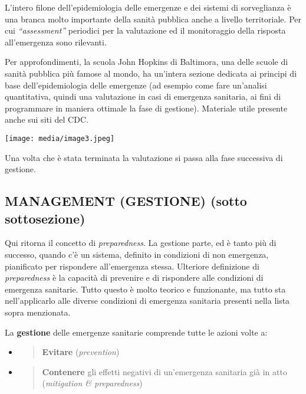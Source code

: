 \documentclass[]{article}
\begin{document}
L'intero filone dell'epidemiologia delle emergenze e dei sistemi di
sorveglianza è una branca molto importante della sanità pubblica anche a
livello territoriale. Per cui \emph{``assessment''} periodici per la
valutazione ed il monitoraggio della risposta all'emergenza sono
rilevanti.

Per approfondimenti, la scuola John Hopkins di Baltimora, una delle
scuole di sanità pubblica più famose al mondo, ha un'intera sezione
dedicata ai principi di base dell'epidemiologia delle emergenze (ad
esempio come fare un'analisi quantitativa, quindi una valutazione in
casi di emergenza sanitaria, ai fini di programmare in maniera ottimale
la fase di gestione). Materiale utile presente anche sui siti del CDC.

\texttt{[image: media/image3.jpeg]}

Una volta che è stata terminata la valutazione si passa alla fase
successiva di gestione.

\subsection{MANAGEMENT (GESTIONE) (sotto
sottosezione)}\label{management-gestione-sotto-sottosezione}

Qui ritorna il concetto di \emph{preparedness}. La gestione parte, ed è
tanto più di successo, quando c'è un sistema, definito in condizioni di
non emergenza, pianificato per rispondere all'emergenza stessa.
Ulteriore definizione di \emph{preparedness} è la capacità di prevenire
e di rispondere alle condizioni di emergenza sanitarie. Tutto questo è
molto teorico e funzionante, ma tutto sta nell'applicarlo alle diverse
condizioni di emergenza sanitaria presenti nella lista sopra menzionata.

La \textbf{gestione} delle emergenze sanitarie comprende tutte le azioni
volte a:

\begin{itemize}
\item
  \begin{quote}
  \textbf{Evitare} (\emph{prevention})
  \end{quote}
\item
  \begin{quote}
  \textbf{Contenere} gli effetti negativi di un'emergenza sanitaria già
  in atto (\emph{mitigation \& preparedness})
  \end{quote}
\end{itemize}
\end{document}
